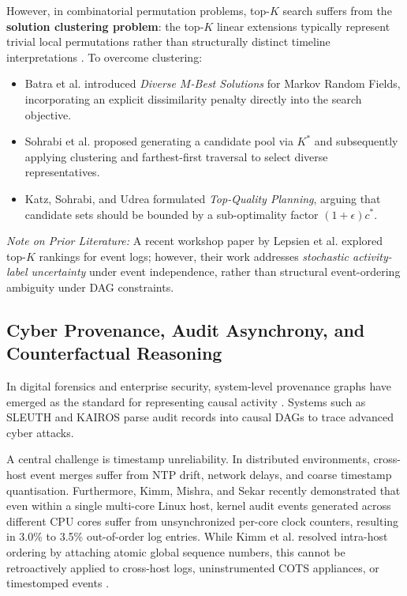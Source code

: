 \documentclass[journal]{IEEEtran}
\begin{document}
However, in combinatorial permutation problems, top-$K$ search suffers from the \textbf{solution clustering problem}: the top-$K$ linear extensions typically represent trivial local permutations rather than structurally distinct timeline interpretations \cite{Sohrabi2016}. To overcome clustering:
\begin{itemize}
    \item Batra et al. \cite{Batra2012} introduced \emph{Diverse $M$-Best Solutions} for Markov Random Fields, incorporating an explicit dissimilarity penalty directly into the search objective.
    \item Sohrabi et al. \cite{Sohrabi2016} proposed generating a candidate pool via $K^*$ and subsequently applying clustering and farthest-first traversal to select diverse representatives.
    \item Katz, Sohrabi, and Udrea \cite{Katz2020, Katz2022} formulated \emph{Top-Quality Planning}, arguing that candidate sets should be bounded by a sub-optimality factor $(1 + \epsilon) c^*$.
\end{itemize}
\emph{Note on Prior Literature:} A recent workshop paper by Lepsien et al. \cite{Lepsien2024} explored top-$K$ rankings for event logs; however, their work addresses \emph{stochastic activity-label uncertainty} under event independence, rather than structural event-ordering ambiguity under DAG constraints.

\subsection{Cyber Provenance, Audit Asynchrony, and Counterfactual Reasoning}
In digital forensics and enterprise security, system-level provenance graphs have emerged as the standard for representing causal activity \cite{Hossain2017, Cheng2024, King2003, Pasquier2017}. Systems such as SLEUTH \cite{Hossain2017} and KAIROS \cite{Cheng2024} parse audit records into causal DAGs to trace advanced cyber attacks.

A central challenge is timestamp unreliability. In distributed environments, cross-host event merges suffer from NTP drift, network delays, and coarse timestamp quantisation. Furthermore, Kimm, Mishra, and Sekar \cite{Kimm2026} recently demonstrated that even within a single multi-core Linux host, kernel audit events generated across different CPU cores suffer from unsynchronized per-core clock counters, resulting in 3.0\% to 3.5\% out-of-order log entries. While Kimm et al. \cite{Kimm2026} resolved intra-host ordering by attaching atomic global sequence numbers, this cannot be retroactively applied to cross-host logs, uninstrumented COTS appliances, or timestomped events \cite{Peisert2007}.
\end{document}
